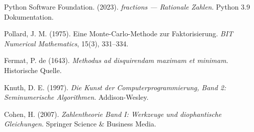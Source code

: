 \documentclass[12pt,a4paper]{article}
\begin{document}
	\begin{thebibliography}{99}
		Python Software Foundation. (2023). \textit{fractions --- Rationale Zahlen}. Python 3.9 Dokumentation.
		
		Pollard, J. M. (1975). Eine Monte-Carlo-Methode zur Faktorisierung. \textit{BIT Numerical Mathematics}, 15(3), 331--334.
		
		Fermat, P. de (1643). \textit{Methodus ad disquirendam maximam et minimam}. Historische Quelle.
		
		Knuth, D. E. (1997). \textit{Die Kunst der Computerprogrammierung, Band 2: Seminumerische Algorithmen}. Addison-Wesley.
		
		Cohen, H. (2007). \textit{Zahlentheorie Band I: Werkzeuge und diophantische Gleichungen}. Springer Science \& Business Media.
	\end{thebibliography}
	
\end{document}
